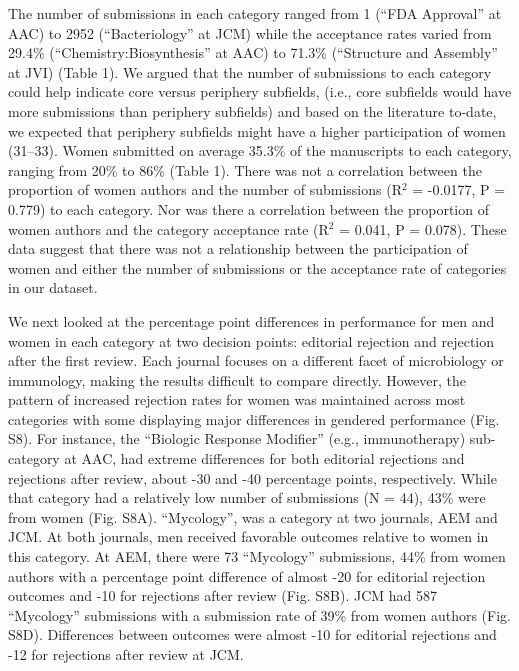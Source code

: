 \documentclass[11pt,]{article}
\begin{document}
The number of submissions in each category ranged from 1 (``FDA
Approval'' at AAC) to 2952 (``Bacteriology'' at JCM) while the
acceptance rates varied from 29.4\% (``Chemistry:Biosynthesis'' at AAC)
to 71.3\% (``Structure and Assembly'' at JVI) (Table 1). We argued that
the number of submissions to each category could help indicate core
versus periphery subfields, (i.e., core subfields would have more
submissions than periphery subfields) and based on the literature
to-date, we expected that periphery subfields might have a higher
participation of women (31--33). Women submitted on average 35.3\% of
the manuscripts to each category, ranging from 20\% to 86\% (Table 1).
There was not a correlation between the proportion of women authors and
the number of submissions (R\({^2}\) = -0.0177, P = 0.779) to each
category. Nor was there a correlation between the proportion of women
authors and the category acceptance rate (R\({^2}\) = 0.041, P = 0.078).
These data suggest that there was not a relationship between the
participation of women and either the number of submissions or the
acceptance rate of categories in our dataset.

We next looked at the percentage point differences in performance for
men and women in each category at two decision points: editorial
rejection and rejection after the first review. Each journal focuses on
a different facet of microbiology or immunology, making the results
difficult to compare directly. However, the pattern of increased
rejection rates for women was maintained across most categories with
some displaying major differences in gendered performance (Fig. S8). For
instance, the ``Biologic Response Modifier'' (e.g., immunotherapy)
sub-category at AAC, had extreme differences for both editorial
rejections and rejections after review, about -30 and -40 percentage
points, respectively. While that category had a relatively low number of
submissions (N = 44), 43\% were from women (Fig. S8A). ``Mycology'', was
a category at two journals, AEM and JCM. At both journals, men received
favorable outcomes relative to women in this category. At AEM, there
were 73 ``Mycology'' submissions, 44\% from women authors with a
percentage point difference of almost -20 for editorial rejection
outcomes and -10 for rejections after review (Fig. S8B). JCM had 587
``Mycology'' submissions with a submission rate of 39\% from women
authors (Fig. S8D). Differences between outcomes were almost -10 for
editorial rejections and -12 for rejections after review at JCM.
\end{document}
